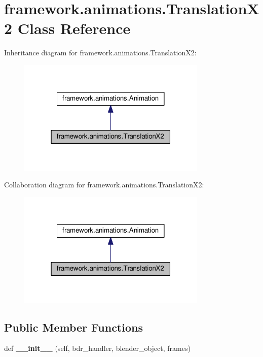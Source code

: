 \hypertarget{classframework_1_1animations_1_1TranslationX2}{}\section{framework.\+animations.\+Translation\+X2 Class Reference}
\label{classframework_1_1animations_1_1TranslationX2}


Inheritance diagram for framework.\+animations.\+Translation\+X2\+:
\nopagebreak
\begin{figure}[H]
\begin{center}
\leavevmode
\includegraphics[width=256pt]{classframework_1_1animations_1_1TranslationX2__inherit__graph}
\end{center}
\end{figure}


Collaboration diagram for framework.\+animations.\+Translation\+X2\+:
\nopagebreak
\begin{figure}[H]
\begin{center}
\leavevmode
\includegraphics[width=256pt]{classframework_1_1animations_1_1TranslationX2__coll__graph}
\end{center}
\end{figure}
\subsection*{Public Member Functions}
\begin{DoxyCompactItemize}
\item 
def {\bfseries \+\_\+\+\_\+init\+\_\+\+\_\+} (self, bdr\+\_\+handler, blender\+\_\+object, frames)\hypertarget{classframework_1_1animations_1_1TranslationX2_a7282fa4205c40d00a787ae5ae2454ebb}{}\label{classframework_1_1animations_1_1TranslationX2_a7282fa4205c40d00a787ae5ae2454ebb}

\end{DoxyCompactItemize}
